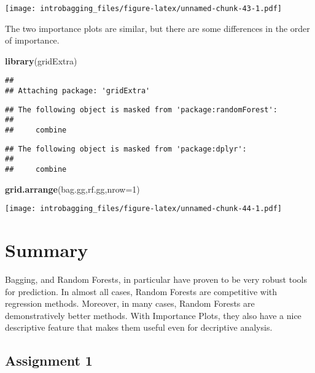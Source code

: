 \documentclass[]{article}
\newenvironment{Shaded}{\begin{snugshade}}{\end{snugshade}}
\newcommand{\DataTypeTok}[1]{\textcolor[rgb]{0.13,0.29,0.53}{#1}}
\newcommand{\DecValTok}[1]{\textcolor[rgb]{0.00,0.00,0.81}{#1}}
\newcommand{\KeywordTok}[1]{\textcolor[rgb]{0.13,0.29,0.53}{\textbf{#1}}}
\newcommand{\NormalTok}[1]{#1}
\begin{document}
\texttt{[image: introbagging\_files/figure-latex/unnamed-chunk-43-1.pdf]}

The two importance plots are similar, but there are some differences in
the order of importance.

\begin{Shaded}
\begin{Highlighting}[]
\KeywordTok{library}\NormalTok{(gridExtra)}
\end{Highlighting}
\end{Shaded}

\begin{verbatim}
## 
## Attaching package: 'gridExtra'
\end{verbatim}

\begin{verbatim}
## The following object is masked from 'package:randomForest':
## 
##     combine
\end{verbatim}

\begin{verbatim}
## The following object is masked from 'package:dplyr':
## 
##     combine
\end{verbatim}

\begin{Shaded}
\begin{Highlighting}[]
\KeywordTok{grid.arrange}\NormalTok{(bag.gg,rf.gg,}\DataTypeTok{nrow=}\DecValTok{1}\NormalTok{)}
\end{Highlighting}
\end{Shaded}

\texttt{[image: introbagging\_files/figure-latex/unnamed-chunk-44-1.pdf]}

\hypertarget{summary}{%
\section{Summary}\label{summary}}

Bagging, and Random Forests, in particular have proven to be very robust
tools for prediction. In almost all cases, Random Forests are
competitive with regression methods. Moreover, in many cases, Random
Forests are demonstratively better methods. With Importance Plots, they
also have a nice descriptive feature that makes them useful even for
decriptive analysis.

\hypertarget{assignment-1-1}{%
\subsection{Assignment 1}\label{assignment-1-1}}
\end{document}
